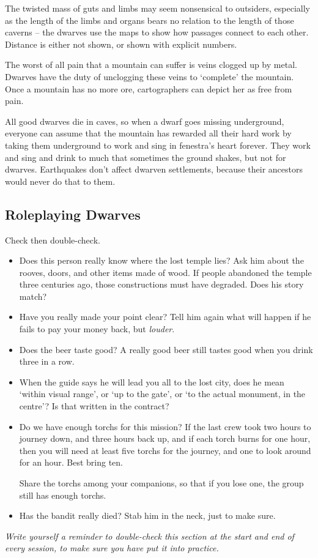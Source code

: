 The twisted mass of guts and limbs may seem nonsensical to outsiders, especially as the length of the limbs and organs bears no relation to the length of those caverns -- the dwarves use the maps to show how passages connect to each other.
Distance is either not shown, or shown with explicit numbers.

The worst of all pain that a mountain can suffer is veins clogged up by metal.
Dwarves have the duty of unclogging these veins to `complete' the mountain.
Once a mountain has no more ore, cartographers can depict her as free from pain.

All good dwarves die in caves, so when a dwarf goes missing underground, everyone can assume that the mountain has rewarded all their hard work by taking them underground to work and sing in \gls{fenestra}'s heart forever.
They work and sing and drink to much that sometimes the ground shakes, but not for dwarves.
Earthquakes don't affect dwarven settlements, because their ancestors would never do that to them.

\subsection{Roleplaying Dwarves}

Check then double-check.

\begin{itemize}
  \item
  Does this person really know where the lost temple lies?
  Ask him about the rooves, doors, and other items made of wood.
  If people abandoned the temple three centuries ago, those constructions must have degraded.
  Does his story match?
  \item
  Have you really made your point clear?
  Tell him again what will happen if he fails to pay your money back, but \emph{louder}.
  \item
  Does the beer taste good?
  A really good beer still tastes good when you drink three in a row.
  \item
  When the guide says he will lead you all to the lost city, does he mean `within visual range', or `up to the gate', or `to the actual monument, in the centre'?
  Is that written in the contract?
  \item
  Do we have enough \glspl{torch} for this mission?
  If the last crew took two hours to journey down, and three hours back up, and if each \gls{torch} burns for one hour, then you will need at least five \glspl{torch} for the journey, and one to look around for an hour.
  Best bring ten.

  Share the \glspl{torch} among your companions, so that if you lose one, the group still has enough \glspl{torch}.
  \item
  Has the bandit really died?
  Stab him in the neck, just to make sure.
\end{itemize}

\emph{Write yourself a reminder to double-check this section at the start and end of every session, to make sure you have put it into practice.}

